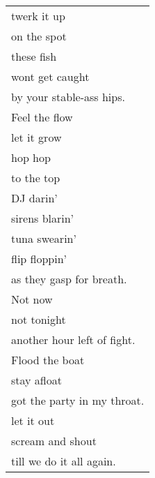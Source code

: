 \documentclass{article}
\begin{document}
\begin{center}
\begin{tabular}{l}
twerk it up \\
on the spot \\
these fish \\
wont get caught \\
by your stable-ass hips. \\
Feel the flow \\
let it grow \\
hop hop \\
to the top \\
DJ darin' \\
sirens blarin' \\
tuna swearin' \\
flip floppin' \\
as they gasp for breath. \\
Not now \\
not tonight \\
another hour left of fight. \\
Flood the boat \\
stay afloat \\
got the party in my throat. \\
let it out \\
scream and shout \\
till we do it all again. \\
\end{tabular}
\end{center}
\end{document}
